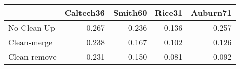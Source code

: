 \begin{tabular}{lrrrr}
\toprule
{} & Caltech36 & Smith60 & Rice31 & Auburn71 \\
\midrule
No Clean Up  &     0.267 &   0.236 &  0.136 &    0.257 \\
Clean-merge  &     0.238 &   0.167 &  0.102 &    0.126 \\
Clean-remove &     0.231 &   0.150 &  0.081 &    0.092 \\
\bottomrule
\end{tabular}
